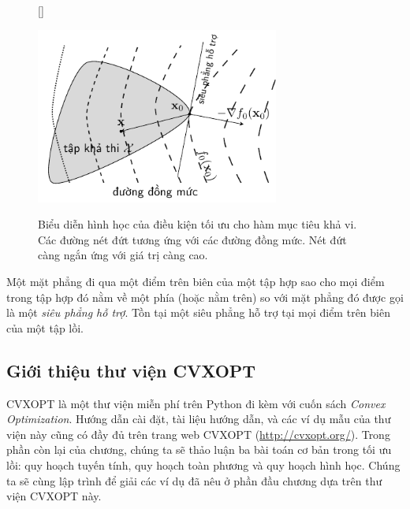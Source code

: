 \begin{figure}[t]    %
    [\FBwidth]
    {\caption{Biểu diễn hình học của điều kiện tối ưu cho hàm mục tiêu khả vi.
    Các đường nét đứt tương ứng với các đường đồng mức. Nét đứt càng ngắn ứng với giá trị càng cao.}
    \label{fig:17_optimalitycondition}}
    {\includegraphics[width=8cm]{Chapters/08_ConvexOptimization/17_convexopt/latex/optimalitycondition_gray.pdf}}
\end{figure}
 
Một mặt phẳng đi qua một điểm trên biên của một tập hợp sao cho mọi điểm trong
tập hợp đó nằm về một phía (hoặc nằm trên) so với mặt phẳng đó được gọi là
một \textit{siêu phẳng hỗ trợ}. Tồn tại một siêu phẳng hỗ trợ tại mọi điểm trên biên của một tập lồi.
 
 
\subsection{Giới thiệu thư viện CVXOPT}
CVXOPT là một thư viện miễn phí trên Python đi kèm với cuốn sách \textit{Convex
Optimization}. Hướng dẫn cài đặt, tài liệu hướng dẫn, và các ví dụ mẫu của thư
viện này cũng có đầy đủ trên trang web CVXOPT (\url{http://cvxopt.org/}). Trong
phần còn lại của chương, chúng ta sẽ thảo luận ba bài toán cơ bản trong tối ưu lồi: quy hoạch tuyến tính, quy hoạch toàn phương và quy hoạch hình học. Chúng ta sẽ cùng lập trình để giải các ví dụ đã nêu ở phần đầu chương dựa trên thư viện CVXOPT này.
 
